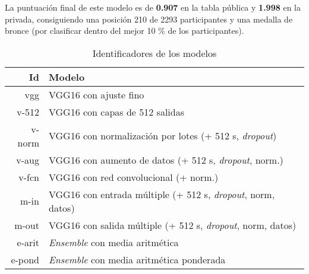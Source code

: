 La puntuación final de este modelo es de \textbf{0.907} en la tabla pública y
\textbf{1.998} en la privada, consiguiendo una posición 210 de 2293
participantes y una medalla de bronce (por clasificar dentro del mejor 10 \% de
los participantes).

\begin{table}[]
\centering
\caption{Identificadores de los modelos}
\label{model_id}
\begin{tabular}{rl}
\textbf{Id} & \textbf{Modelo}                                                       \\ \hline
vgg         & VGG16 con ajuste fino                                                 \\
v-512       & VGG16 con capas de 512 salidas                                        \\
v-norm      & VGG16 con normalización por lotes (+ 512 s, \textit{dropout})       \\
v-aug       & VGG16 con aumento de datos (+ 512 s, \textit{dropout}, norm.)       \\
v-fcn       & VGG16 con red convolucional (+ norm.)                                 \\
m-in        & VGG16 con entrada múltiple (+ 512 s, \textit{dropout}, norm, datos) \\
m-out       & VGG16 con salida múltiple (+ 512 s, \textit{dropout}, norm, datos)  \\
e-arit      & \textit{Ensemble} con media aritmética                              \\
e-pond      & \textit{Ensemble} con media aritmética ponderada                   
\end{tabular}
\end{table}

